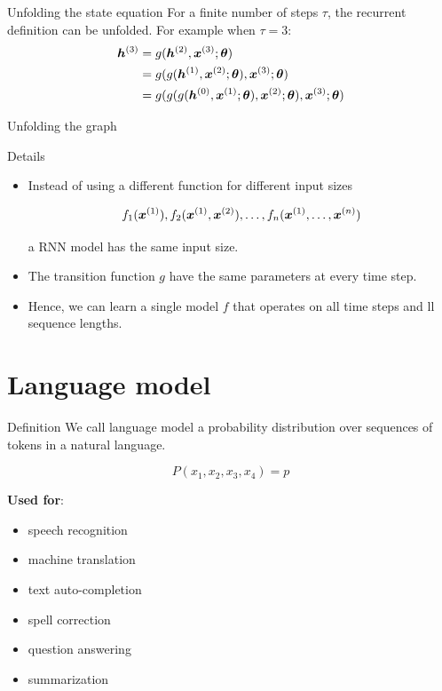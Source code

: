 \documentclass[10pt]{beamer}
\begin{document}
\begin{frame}{Unfolding the state equation}
For a finite number of steps $\tau$, the recurrent definition can be unfolded. For example when $\tau =3$:
\vspace{0.2cm}
\Large{
\begin{align*}
\bm{h}^{(3)}& = g(\bm{h}^{(2)}, \bm{x}^{(3)}; \bm{\theta})\\
 & = g(g(\bm{h}^{(1)}, \bm{x}^{(2)}; \bm{\theta}), \bm{x}^{(3)}; \bm{\theta})\\
 & = g(g(g(\bm{h}^{(0)}, \bm{x}^{(1)}; \bm{\theta}), \bm{x}^{(2)}; \bm{\theta}), \bm{x}^{(3)}; \bm{\theta})\\
\end{align*}
}
\end{frame}

\begin{frame}{Unfolding the graph}

\end{frame}



\begin{frame}{Details}
\begin{itemize}
\item Instead of using a different function for different input sizes

\[
f_1(\bm{x}^{(1)}), f_2(\bm{x}^{(1)}, \bm{x}^{(2)}), \dots ,f_n(\bm{x}^{(1)}, \dots, \bm{x}^{(n)})
\]


a RNN model has the same input size.  
\vspace{0.2cm}
\item The transition function $g$ have the same parameters at every time step.
\vspace{0.2cm}
\item Hence, we can learn a single model $f$ that operates on all time steps and ll sequence lengths.
\end{itemize}

\end{frame}

\section{Language model}

\begin{frame}{Definition}
We call \alert{language model} a probability distribution over sequences of tokens in a natural language.

\[
P(x_1,x_2,x_3,x_4) = p
\]

\textbf{Used for}:
\begin{itemize}
\item speech recognition
\item machine translation
\item text auto-completion
\item spell correction
\item question answering
\item summarization
\end{itemize}


\end{frame}
\end{document}
